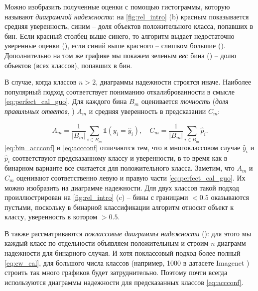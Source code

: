 \documentclass[12pt]{article}
\begin{document}
Можно изобразить полученные оценки с помощью гистограммы, которую называют \emph{диаграммой надежности}: на \autoref{fig:rel_intro} (b) красным показывается средняя уверенность, синим -- доля объектов положительного класса, попавших в бин. Если красный столбец выше синего, то алгоритм выдает недостаточно уверенные оценки (), если синий выше красного -- слишком большие (). Дополнительно на том же графике мы покажем зеленым \emph{вес} бина () -- долю объектов (всех классов), попавших в бин. 

В случае, когда классов $n>2$, диаграммы надежности строятся иначе. Наиболее популярный подход соответствует пониманию откалиброванности в смысле \eqref{eq:perfect_cal_guo}. Для каждого бина $B_m$ оценивается \emph{точность} (\emph{доля правильных ответов}, ) $A_m$ и средняя уверенность в предсказании $C_m$:

\begin{equation}\label{eq:accconf}
    A_m=\frac{1}{|B_m|}\sum_{i\in B_m} \mathbb{1}(y_i=\hat{y}_i),
    \quad
    C_m=\frac{1}{|B_m|}\sum_{i\in B_m} \hat{p}_i.
\end{equation}
\eqref{eq:bin_accconf} и \eqref{eq:accconf} отличаются тем, что в многоклассовом случае $\hat{y}_i$ и $\hat{p}_i$ соответствуют предсказанному классу и уверенности, в то время как в бинарном варианте все считается для положительного класса.
Заметим, что $A_m$ и $C_m$ оценивают соответственно левую и правую части \eqref{eq:perfect_cal_guo}. Их можно изобразить на диаграмме надежности. Для двух классов такой подход проиллюстрирован на \autoref{fig:rel_intro} (c) -- бины с границами $<0.5$ оказываются пустыми, поскольку в бинарной классификации алгоритм относит объект к классу, уверенность в котором $>0.5$.

В \cite{dirichlet} также рассматриваются \emph{поклассовые диаграммы надежности} (): для этого мы каждый класс по отдельности объявляем положительным и строим $n$ диаграмм надежности для бинарного случая. И хотя поклассовый подход более полный \eqref{eq:cw_cal}, для большого числа классов (например, 1000 в датасете Imagenet \cite{imagenet}) строить так много графиков будет затруднительно. Поэтому почти всегда используются диаграммы надежности для предсказанных классов \eqref{eq:accconf}.
\end{document}

